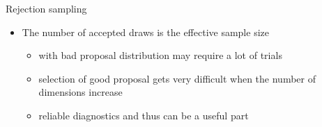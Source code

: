 \documentclass[finnish,english,t]{beamer}
\begin{document}
\begin{frame}
  
  {\Large\color{navyblue} Rejection sampling}

  \begin{itemize}
  \item The number of accepted draws is the effective sample size
    \begin{itemize}
    \item with bad proposal distribution may require a lot of trials
    \item selection of good proposal gets very difficult when
      the number of dimensions increase
    \item reliable diagnostics and thus can be a useful part
    \end{itemize}
  \end{itemize}

\end{frame}
\end{document}
